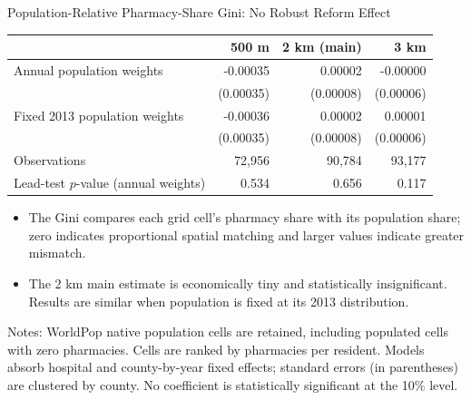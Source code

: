 \documentclass[aspectratio=169,11pt]{beamer}
\begin{document}
\begin{frame}{Population-Relative Pharmacy-Share Gini: No Robust Reform Effect}
\centering
\footnotesize
\begin{tabular}{lrrr}
\toprule
 & 500 m & 2 km (main) & 3 km \\
\midrule
Annual population weights
 & -0.00035 & 0.00002 & -0.00000 \\
 & (0.00035) & (0.00008) & (0.00006) \\
Fixed 2013 population weights
 & -0.00036 & 0.00002 & 0.00001 \\
 & (0.00035) & (0.00008) & (0.00006) \\
\addlinespace
Observations
 & 72,956 & 90,784 & 93,177 \\
Lead-test $p$-value (annual weights)
 & 0.534 & 0.656 & 0.117 \\
\bottomrule
\end{tabular}

\vspace{0.45em}
\begin{itemize}\setlength\itemsep{0.25em}
  \item The Gini compares each grid cell's pharmacy share with its population share; zero indicates proportional spatial matching and larger values indicate greater mismatch.
  \item The 2 km main estimate is economically tiny and statistically insignificant. Results are similar when population is fixed at its 2013 distribution.
\end{itemize}
\vspace{0.1em}
\raggedright\tiny Notes: WorldPop native population cells are retained, including populated cells with zero pharmacies. Cells are ranked by pharmacies per resident. Models absorb hospital and county-by-year fixed effects; standard errors (in parentheses) are clustered by county. No coefficient is statistically significant at the 10\% level.
\end{frame}
\end{document}
